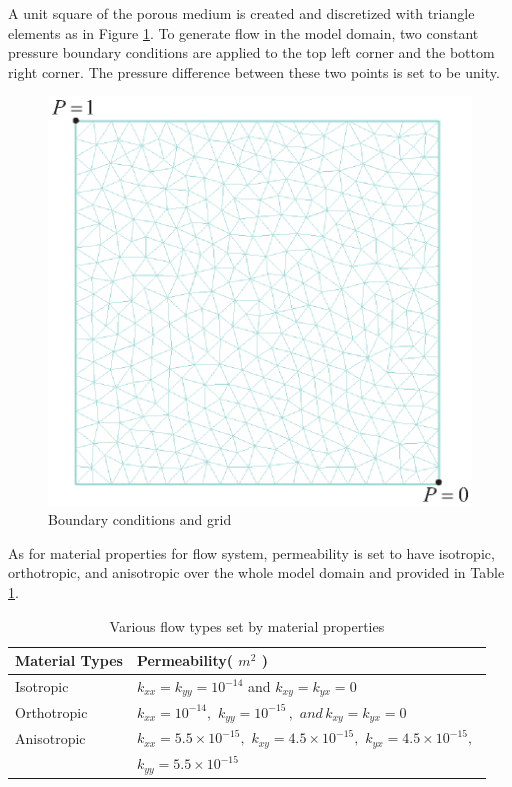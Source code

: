 A unit square of the porous medium is created and discretized with triangle elements as in Figure \ref{BCandGrid}. To generate flow in the model domain, two constant pressure boundary conditions are applied to the top left corner and the bottom right corner. The pressure difference between these two points is set to be unity.
\begin{figure}[H]
\centering
\includegraphics[scale=0.60]{Anisotropy/figures/grid.eps}
\caption{Boundary conditions and grid}
\label{BCandGrid}
\end{figure}

As for material properties for flow system, permeability is set to have isotropic, orthotropic, and anisotropic over the whole model domain and provided in Table \ref{tab:materials_permeability}.

\begin{table}[!htb]
\label{tab:materials_permeability}
\centering
\begin{tabular}{ll}
\hline\hline
{\smallskip}
Material Types & Permeability( $m^2$ ) \\
\hline
Isotropic & $k_{xx}  = k_{yy}  = 10^{ - 14} $ and $k_{xy}  = k_{yx}  = 0$ \\
Orthotropic & $k_{xx}  = 10^{ - 14} ,\,\,k_{yy}  = 10^{ - 15} \,,\,\,and\,k_{xy}  = k_{yx}  = 0$ \\
Anisotropic    & $k_{xx}  = 5.5 \times 10^{ - 15} ,\,\,k_{xy}  = 4.5 \times 10^{ - 15} ,\,\,k_{yx}  = 4.5 \times 10^{ - 15} ,\,\,$ \\
&$k_{yy}  = 5.5 \times 10^{ - 15}$\\
\hline\hline
\end{tabular}
\caption{Various flow types set by material properties}
\end{table}

